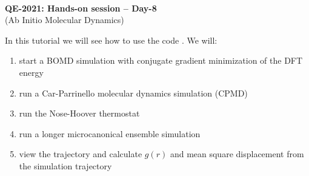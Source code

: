 \documentclass[landscape]{foils}
\begin{document}

\blue
~\\
\vspace*{4cm}
\MyLogo{~}
\vspace{5em}
\begin{center}
  {\burgundy\LARGE\bf QE-2021: Hands-on session -- Day-8}\\[2em]
  {\burgundy\LARGE (Ab Initio Molecular Dynamics)}
  ~\\[1.5em]
\end{center}

In this tutorial we will see how to use the code . We will:
\begin{enumerate}
\item start a BOMD simulation with conjugate gradient minimization of the DFT energy
\item run a Car-Parrinello molecular dynamics simulation (CPMD)
\item run the Nose-Hoover thermostat
\item run a longer microcanonical ensemble simulation
\item view the trajectory and calculate $g(r)$ and mean square displacement from the simulation trajectory
\end{enumerate}
\end{document}
